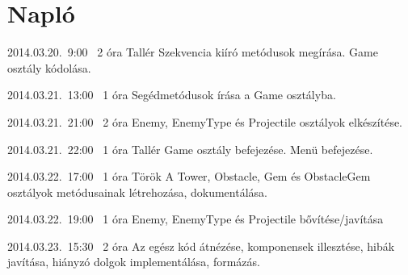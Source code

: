 %
\section{Napló}

\begin{naplo}

\bejegyzes
{2014.03.20.~9:00~} %
{2 óra} %
{Tallér} %
{Szekvencia kiíró metódusok megírása. Game osztály kódolása.}

\bejegyzes
{2014.03.21.~13:00~}
{1 óra}
{\vantal}
{Segédmetódusok írása a Game osztályba.}

\bejegyzes
{2014.03.21.~21:00~}
{2 óra}
{\vantal}
{Enemy, EnemyType és Projectile osztályok elkészítése.}

\bejegyzes
{2014.03.21.~22:00~} %
{1 óra} %
{Tallér} %
{Game osztály befejezése. Menü befejezése.}

\bejegyzes
{2014.03.22.~17:00~} %
{1 óra} %
{Török} %
{A Tower, Obstacle, Gem és ObstacleGem osztályok metódusainak létrehozása, dokumentálása.}

\bejegyzes
{2014.03.22.~19:00~}
{1 óra}
{\vantal}
{Enemy, EnemyType és Projectile bővítése/javítása}

\bejegyzes
{2014.03.23.~15:30~}
{2 óra}
{\vantal}
{Az egész kód átnézése, komponensek illesztése, hibák javítása, hiányzó dolgok implementálása, formázás.}


\end{naplo}

